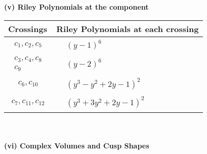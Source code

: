 \documentclass[1p]{elsarticle_modified}
\theoremstyle{definition}
\begin{document}
\newpage\renewcommand{\arraystretch}{1}
\flushleft \textbf{(v) Riley Polynomials at the component}\newline \\
\begin{tabular}{m{50pt}|m{274pt}}
Crossings & \hspace{64pt}Riley Polynomials at each crossing \\
\hline $$\begin{aligned}c_{1},c_{2},c_{5}\end{aligned}$$&$\begin{aligned}
&(y-1)^6
\end{aligned}$\\
\hline $$\begin{aligned}c_{3},c_{4},c_{8}\\c_{9}\end{aligned}$$&$\begin{aligned}
&(y-2)^6
\end{aligned}$\\
\hline $$\begin{aligned}c_{6},c_{10}\end{aligned}$$&$\begin{aligned}
&(y^3- y^2+2 y-1)^2
\end{aligned}$\\
\hline $$\begin{aligned}c_{7},c_{11},c_{12}\end{aligned}$$&$\begin{aligned}
&(y^3+3 y^2+2 y-1)^2
\end{aligned}$\\
\hline
\end{tabular}\\~\\
\newpage\flushleft \textbf{(vi) Complex Volumes and Cusp Shapes}
\end{document}
